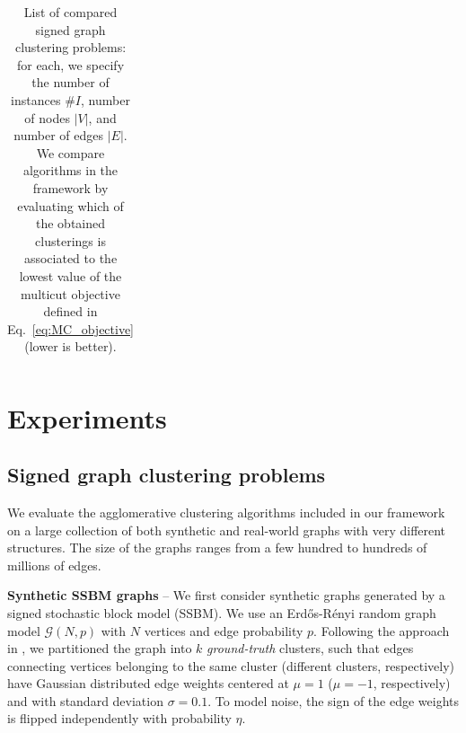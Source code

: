 \begin{table}[t]
\begin{subtable}[t!]{\textwidth}
\begin{tabular}{l  c  r  c  c  | r r r r r r}


        \end{tabular}
    \end{subtable} 
    \caption{List of compared signed graph clustering problems: for each, we specify the number of instances $\# I$, number of nodes $|V|$, and number of edges $|E|$. We compare algorithms in the \algname{} framework by evaluating which of the obtained clusterings is associated to the lowest value of the multicut objective defined in Eq.~\ref{eq:MC_objective} (lower is better).} 
    \label{tab:datasets_and_energies}
\end{table}


\section{Experiments}\label{sec:neuro_segm_exp}
\subsection{Signed graph clustering problems}
We evaluate the agglomerative clustering algorithms included in our framework on a large collection of both synthetic and real-world graphs with very different structures. The size of the graphs ranges from a few hundred to hundreds of millions of edges.

\textbf{Synthetic SSBM graphs} -- We first consider synthetic graphs generated by a signed stochastic block model (SSBM). We use an Erd\H os-R\'enyi random graph model $\mathcal{G}(N,p)$ with $N$ vertices and edge probability $p$. Following the approach in \cite{Cucuringu2019SPONGEAG}, we partitioned the graph into $k$ \emph{ground-truth} clusters, such that edges connecting vertices belonging to the same cluster (different clusters, respectively) have Gaussian distributed edge weights centered at $\mu=1$ ($\mu=-1$, respectively) and with standard deviation $\sigma=0.1$. To model noise, the sign of the edge weights is flipped independently with probability $\eta$.


